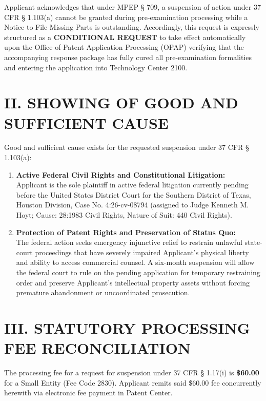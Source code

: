 \documentclass[11pt,letterpaper]{article}
\begin{document}
Applicant acknowledges that under MPEP \S{} 709, a suspension of action under 37 CFR \S{} 1.103(a) cannot be granted during pre-examination processing while a Notice to File Missing Parts is outstanding. Accordingly, this request is expressly structured as a \textbf{CONDITIONAL REQUEST} to take effect automatically upon the Office of Patent Application Processing (OPAP) verifying that the accompanying response package has fully cured all pre-examination formalities and entering the application into Technology Center 2100.

\section*{II. SHOWING OF GOOD AND SUFFICIENT CAUSE}

Good and sufficient cause exists for the requested suspension under 37 CFR \S{} 1.103(a):
\begin{enumerate}[leftmargin=*]
    \item \textbf{Active Federal Civil Rights and Constitutional Litigation:} \\
    Applicant is the sole plaintiff in active federal litigation currently pending before the United States District Court for the Southern District of Texas, Houston Division, Case No. 4:26-cv-08794 (assigned to Judge Kenneth M. Hoyt; Cause: 28:1983 Civil Rights, Nature of Suit: 440 Civil Rights).

    \item \textbf{Protection of Patent Rights and Preservation of Status Quo:} \\
    The federal action seeks emergency injunctive relief to restrain unlawful state-court proceedings that have severely impaired Applicant's physical liberty and ability to access commercial counsel. A six-month suspension will allow the federal court to rule on the pending application for temporary restraining order and preserve Applicant's intellectual property assets without forcing premature abandonment or uncoordinated prosecution.
\end{enumerate}

\section*{III. STATUTORY PROCESSING FEE RECONCILIATION}

The processing fee for a request for suspension under 37 CFR \S{} 1.17(i) is \textbf{\$60.00} for a Small Entity (Fee Code 2830). Applicant remits said \$60.00 fee concurrently herewith via electronic fee payment in Patent Center.
\end{document}
